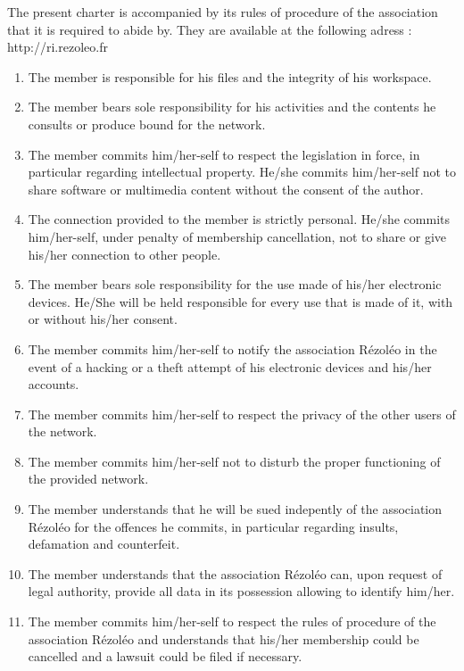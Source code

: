 \documentclass[12pt]{article}
\begin{document}
\vspace*{0.5cm}


The present charter is accompanied by its rules of procedure of the association that it is required to
abide by. They are available at the following adress : http://ri.rezoleo.fr 

\vspace*{0.5cm}

\begin{enumerate}[leftmargin=*]

\item The member is responsible for his files and the integrity of his workspace.

\item The member bears sole responsibility for his activities and the contents he consults or produce bound for
the network.

\item The member commits him/her-self to respect the legislation in force, in particular regarding intellectual
property. He/she commits him/her-self not to share software or multimedia content without the consent of the
author.

\item The connection provided to the member is strictly personal. He/she commits him/her-self, under penalty of
membership cancellation, not to share or give his/her connection to other people.

\item The member bears sole responsibility for the use made of his/her electronic devices. He/She will be held
responsible for every use that is made of it, with or without his/her consent.

\item The member commits him/her-self to notify the association Rézoléo in the event of a hacking or a theft
attempt of his electronic devices and his/her accounts.

\item The member commits him/her-self to respect the privacy of the other users of the network.

\item The member commits him/her-self not to disturb the proper functioning of the provided network.

\item The member understands that he will be sued indepently of the association Rézoléo for the offences he
commits, in particular regarding insults, defamation and counterfeit.

\item The member understands that the association Rézoléo can, upon request of legal authority, provide all
data in its possession allowing to identify him/her.

\item The member commits him/her-self to respect the rules of procedure of the association Rézoléo and
understands that his/her membership could be cancelled and a lawsuit could be filed if necessary.

\end{enumerate}
\end{document}
